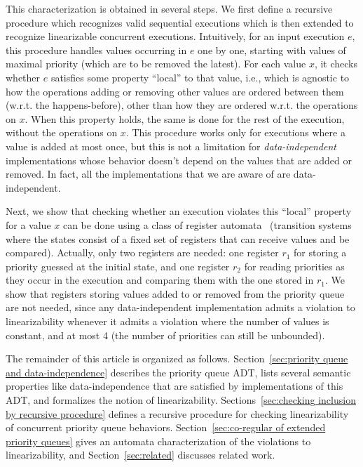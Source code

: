 This characterization is obtained in several steps. We first define a recursive procedure which recognizes valid sequential executions which is then extended to recognize linearizable concurrent executions. Intuitively, for an input execution $e$, this procedure handles values occurring in $e$ one by one, starting with values of maximal priority (which are to be removed the latest). For each value $x$, it checks whether $e$ satisfies some property ``local'' to that value, i.e., which is agnostic to how the operations adding or removing other values are ordered between them (w.r.t. the happens-before), other than how they are ordered w.r.t. the operations on $x$. When this property holds, the same is done for the rest of the execution, without the operations on $x$. This procedure works only for executions where a value is added at most once, but this is not a limitation for \emph{data-independent} implementations whose behavior doesn't depend on the values that are added or removed. In fact, all the implementations that we are aware of are data-independent.

Next, we show that checking whether an execution violates this ``local'' property for a value $x$ can be done using a class of register automata~\cite{DBLP:journals/tcs/KaminskiF94,DBLP:conf/icalp/Cerans94,DBLP:conf/stacs/SegoufinT11} (transition systems where the states consist of a fixed set of registers that can receive values and be compared). Actually, only two registers are needed: one register $r_1$ for storing a priority guessed at the initial state, and one register $r_2$ for reading priorities as they occur in the execution and comparing them with the one stored in $r_1$. We show that registers storing values added to or removed from the priority queue are not needed, since any data-independent implementation admits a violation to linearizability whenever it admits a violation where the number of values is constant, and at most 4 (the number of priorities can still be unbounded).

The remainder of this article is organized as follows.
Section~\ref{sec:priority queue and data-independence} describes the priority queue ADT, lists several semantic properties like data-independence that are satisfied by implementations of this ADT, and formalizes the notion of linearizability. 
Sections~\ref{sec:checking inclusion by recursive procedure} defines a recursive procedure for checking linearizability of concurrent priority queue behaviors.
Section~\ref{sec:co-regular of extended priority queues} gives an automata characterization of the violations to linearizability, and
Section~\ref{sec:related} discusses related work.




